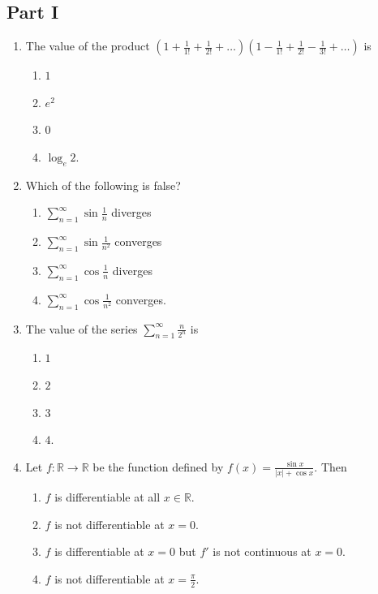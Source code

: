 \documentclass[11pt, a4paper]{article}
\begin{document}
\subsection*{Part I}
\begin{enumerate}
  \item The value of the product $\left(1 + \frac{1}{1!} + \frac{1}{2!} + \dots\right)\left(1 - \frac{1}{1!} + \frac{1}{2!} - \frac{1}{3!} + \dots\right)$ is
  \begin{enumerate}[label=\Alph*.]
    \item $1$
    \item $e^2$
    \item $0$
    \item $\log_e 2$.
  \end{enumerate}

  \item Which of the following is false?
  \begin{enumerate}[label=\Alph*.]
    \item $\sum_{n=1}^\infty \sin\frac{1}{n}$ diverges
    \item $\sum_{n=1}^\infty \sin\frac{1}{n^2}$ converges
    \item $\sum_{n=1}^\infty \cos\frac{1}{n}$ diverges
    \item $\sum_{n=1}^\infty \cos\frac{1}{n^2}$ converges.
  \end{enumerate}

  \item The value of the series $\displaystyle \sum_{n=1}^\infty \frac{n}{2^n}$ is
  \begin{enumerate}[label=\Alph*.]
    \item $1$
    \item $2$
    \item $3$
    \item $4$.
  \end{enumerate}

  \item Let $f: \mathbb{R} \to \mathbb{R}$ be the function defined by $f(x) = \frac{\sin x}{|x| + \cos x}$. Then
  \begin{enumerate}[label=\Alph*.]
    \item $f$ is differentiable at all $x \in \mathbb{R}$.
    \item $f$ is not differentiable at $x = 0$.
    \item $f$ is differentiable at $x = 0$ but $f'$ is not continuous at $x = 0$.
    \item $f$ is not differentiable at $x = \frac{\pi}{2}$.
  \end{enumerate}


\end{enumerate}
\end{document}
